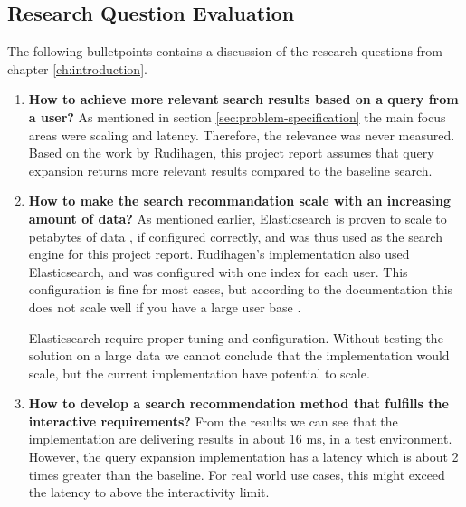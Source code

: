 \subsection{Research Question Evaluation}
The following bulletpoints contains a discussion of the research questions from chapter \ref{ch:introduction}.

\begin{enumerate}
  \item \textbf{How to achieve more relevant search results based on a query from a user?} \newline
  As mentioned in section \ref{sec:problem-specification} the main focus areas were scaling and latency.
  Therefore, the relevance was never measured.
  Based on the work by Rudihagen,
  this project report assumes that query expansion returns more relevant results compared to the baseline search.

  \item\label{rq:scaling} \textbf{How to make the search recommandation scale with an increasing amount of data?} \newline
  As mentioned earlier, Elasticsearch is proven to scale to petabytes of data \cite{elasticsearch-scale},
  if configured correctly, and was thus used as the search engine for this project report.
  Rudihagen's implementation also used Elasticsearch, and was configured with one index for each user.
  This configuration is fine for most cases, but according to the documentation this does not scale well if you have a large user base \cite{elasticsearch-indices}.

  Elasticsearch require proper tuning and configuration.
  Without testing the solution on a large data we cannot conclude that the implementation would scale,
  but the current implementation have potential to scale.

  \item\label{rq:latency} \textbf{How to develop a search recommendation method that fulfills the interactive requirements?} \newline
  From the results we can see that the implementation are delivering results in about 16 ms, in a test environment.
  However, the query expansion implementation has a latency which is about 2 times greater than the baseline.
  For real world use cases, this might exceed the latency to above the interactivity limit.
\end{enumerate}
